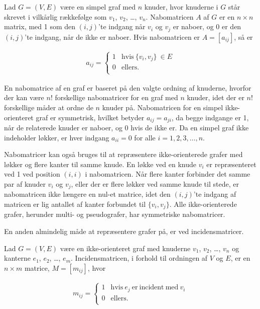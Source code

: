 \begin{defn}
Lad $G=(V,E)$ være en simpel graf med $n$ knuder, hvor knuderne i $G$ står skrevet i vilkårlig rækkefølge som $v_1$, $v_2$, \dots , $v_n$.
Nabomatricen $A$ af $G$ er en $n \times n$ matrix, med 1 som den $(i,j)$’te indgang når $v_i$ og $v_j$ er naboer, og 0 er den $(i,j)$’te indgang, når de ikke er naboer. Hvis nabomatricen er $A=[a_{ij}]$, så er

\begin{align*}
	a_{ij}= \left\{\begin{array}{cc}
	1 & \textrm{hvis} \  \lbrace v_i, v_j \rbrace \  \in E \\
	0 & \textrm{ellers} .\\
	\end{array}\right.
\end{align*}
\end{defn}

En nabomatrice af en graf er baseret på den valgte ordning af knuderne, hvorfor der kan være $n!$ forskellige nabomatricer for en graf med $n$ knuder, idet der er $n!$ forskellige måder at ordne de $n$ knuder på.
Nabomatricen for en simpel ikke-orienteret graf er symmetrisk, hvilket betyder $a_{ij}=a_{ji}$, da begge indgange er 1, når de relaterede knuder er naboer, og 0 hvis de ikke er.
Da en simpel graf ikke indeholder løkker, er hver indgang $a_{ii}=0$ for alle $i=1,2,3, \dots ,n$. 

Nabomatricer kan også bruges til at repræsentere ikke-orienterede grafer med løkker og flere kanter til samme knude.
En løkke ved en knude $v_i$ er repræsenteret ved 1 ved position $(i,i)$ i nabomatricen.
Når flere kanter forbinder det samme par af knuder $v_i$ og $v_j$, eller der er flere løkker ved samme knude til stede, er nabomatricen ikke længere en nul-et matrice, idet den $(i,j)$’te indgang af matricen er lig antallet af kanter forbundet til $\lbrace v_i,v_j \rbrace$.
Alle ikke-orienterede grafer, herunder multi- og pseudografer, har symmetriske nabomatricer.

En anden almindelig måde at repræsentere grafer på, er ved incidensmatricer.

\begin{defn}
Lad $G=(V,E)$ være en ikke-orienteret graf med knuderne $v_1$, $v_2$, \dots , $v_n$ og kanterne $e_1$, $e_2$, \dots , $e_m$. Incidensmatricen, i forhold til ordningen af $V$ og $E$, er en $n \times m$ matrice, $M=[m_{ij}]$, hvor 

\begin{align*}
	m_{ij}= \left\{\begin{array}{cc}
	1 & \textrm{hvis} \  {e_j} \  \textrm{er} \  \textrm{incident} \ \textrm{med} \ v_i \\
	0 & \textrm{ellers}. \\
	\end{array}\right.
\end{align*}
\end{defn}

